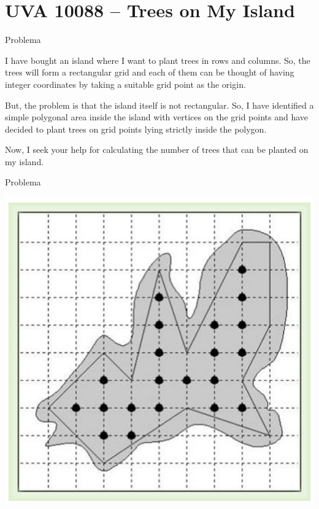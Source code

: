 \section{UVA 10088 -- Trees on My Island}

\begin{frame}[fragile]{Problema}

I have bought an island where I want to plant trees in rows and columns. So, the trees will
form a rectangular grid and each of them can be thought of having integer coordinates by taking
a suitable grid point as the origin.

But, the problem is that the island itself is not rectangular. So, I have identified a simple
polygonal area inside the island with vertices on the grid points and have decided to plant trees
on grid points lying strictly inside the polygon.

Now, I seek your help for calculating the number of trees that can be planted on my island.

\end{frame}

\begin{frame}[fragile]{Problema}

\begin{center}
\includegraphics[scale=0.8]{figure.png}
\end{center}

\end{frame}

